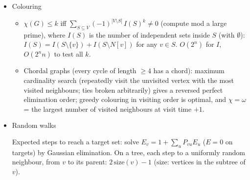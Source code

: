 \begin{itemize}
\item Colouring
\begin{itemize}
  \item $\chi(G) \le k$ iff $\sum_{S \subseteq V} (-1)^{|V \setminus S|}\, I(S)^k \ne 0$ (compute mod a large prime), where $I(S)$ is the number of independent sets inside $S$ (with $\emptyset$): $I(S) = I(S \setminus \{v\}) + I(S \setminus N[v])$ for any $v \in S$. $O(2^n)$ for $I$, $O(2^n n)$ to test all $k$.
  \item Chordal graphs (every cycle of length $\ge 4$ has a chord): maximum cardinality search (repeatedly visit the unvisited vertex with the most visited neighbours; ties broken arbitrarily) gives a reversed perfect elimination order; greedy colouring in visiting order is optimal, and $\chi = \omega$ = the largest number of visited neighbours at visit time $+ 1$.
\end{itemize}

\item Random walks

Expected steps to reach a target set: solve $E_v = 1 + \sum_u P_{vu} E_u$ ($E = 0$ on targets) by Gaussian elimination. On a tree, each step to a uniformly random neighbour, from $v$ to its parent: $2\,\mathrm{size}(v) - 1$ ($\mathrm{size}$: vertices in the subtree of $v$).
\end{itemize}
